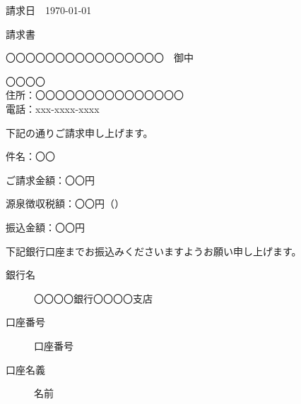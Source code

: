 \documentclass{jlreq}
\newcommand{\請求日}[1]{\begin{flushright}請求日　#1\end{flushright}}
\newcommand{\請求書}{\begin{center}{\Huge 請求書}\end{center}}
\newcommand{\御中}[1]{#1　御中}
\newcommand{\振込先}[3]{
    \begin{description}
        \item[銀行名] #1
        \item[口座番号] #2
        \item[口座名義] #3
    \end{description}
}
\begin{document}
\noindent

\請求日{\today}

\請求書

\御中{〇〇〇〇〇〇〇〇〇〇〇〇〇〇〇〇}


\begin{flushright}
〇〇〇〇\\
住所：〇〇〇〇〇〇〇〇〇〇〇〇〇〇〇\\
電話：xxx-xxxx-xxxx\\
\end{flushright}


下記の通りご請求申し上げます。

件名：〇〇

ご請求金額：〇〇円

源泉徴収税額：〇〇円（）

振込金額：〇〇円

下記銀行口座までお振込みくださいますようお願い申し上げます。

\振込先{〇〇〇〇銀行〇〇〇〇支店}{口座番号}{名前}
\end{document}
